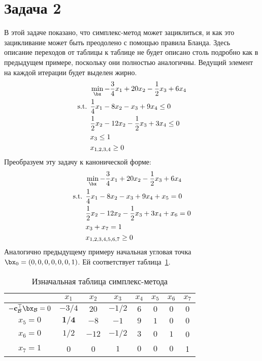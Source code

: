 \documentclass[12pt]{article}
\begin{document}
\section{Задача 2}
В этой задаче показано, что симплекс-метод может зациклиться, и как это зацикливание может быть преодолено с помощью правила Бланда. 
Здесь описание переходов от таблицы к таблице не будет описано столь подробно как в предыдущем примере, поскольку они полностью аналогичны. 
Ведущий элемент на каждой итерации будет выделен жирно.
\begin{equation*}
\begin{split}
& \min_{\bx} -\frac{3}{4}x_1 + 20x_2 - \frac{1}{2}x_3 + 6x_4\\
\text{s.t. } & \frac{1}{4}x_1 - 8x_2 - x_3 + 9x_4 \leq 0\\
& \frac{1}{2}x_2 - 12x_2 - \frac{1}{2}x_3 + 3x_4 \leq 0\\
& x_3 \leq 1\\
& x_{1,2,3,4} \geq 0
\end{split}
\end{equation*}
Преобразуем эту задачу к канонической форме:
\begin{equation*}
\begin{split}
& \min_{\bx} -\frac{3}{4}x_1 + 20x_2 - \frac{1}{2}x_3 + 6x_4\\
\text{s.t. } & \frac{1}{4}x_1 - 8x_2 - x_3 + 9x_4 + x_5 = 0\\
& \frac{1}{2}x_2 - 12x_2 - \frac{1}{2}x_3 + 3x_4 + x_6 = 0\\
& x_3 + x_7 = 1\\
& x_{1,2,3,4,5,6,7} \geq 0
\end{split}
\end{equation*}
Аналогично предыдущему примеру начальная угловая точка $\bx_0 = (0,0,0,0, 0,0,1)$.
Ей соответствует таблица~\ref{tab::simplex_20}.

\begin{table}[!ht]
\centering
\caption{Изначальная таблица симплекс-метода}
\begin{tabular}{|c|ccccccc|}
\hline
& $x_1$ & $x_2$ & $x_3$ & $x_4$ & $x_5$ & $x_6$ & $x_7$\\
\hline
$-\mathbf{c}_{\mathcal{B}}^{\top}\bx_{\mathcal{B}} = 0$ & $-3/4$ & $20$ & $-1/2$ & $6$ & $0$ & $0$ & $0$ \\
\hline
$x_5 = 0$ & $\mathbf{1/4}$ & $-8$ & $-1$ & $9$ & $1$ & $0$ & $0$ \\
$x_6 = 0$ & $1/2$ & $-12$ & $-1/2$ & $3$ & $0$ & $1$ & 0 \\
$x_7 = 1$ & 0 & 0 & $1$ & $0$ & $0$ & $0$ & 1 \\
\hline
\end{tabular}
\label{tab::simplex_20}
\end{table}
\end{document}

